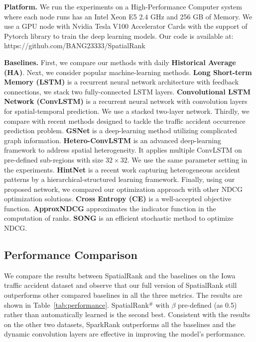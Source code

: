 \documentclass{article}
\begin{document}
{\textbf{Platform.} 
We run the experiments on a High-Performance Computer system where each node runs has an Intel Xeon E5 2.4 GHz and 256 GB of Memory. We use a GPU node with Nvidia Tesla V100 Accelerator Cards with the support of Pytorch library \cite{NEURIPS2019_9015} to train the deep learning models. Our code is available at: https://github.com/BANG23333/SpatialRank

\textbf{Baselines.} First, we compare our methods with daily \textbf{Historical Average (HA)}. Next, we consider popular machine-learning methods. \textbf{Long Short-term Memory (LSTM)} \cite{HochSchm97} is a recurrent neural network architecture with feedback connections, we stack two fully-connected LSTM layers. \textbf{Convolutional LSTM Network (ConvLSTM)} \cite{ShiXingjian2015CLNA} is a recurrent neural network with convolution layers for spatial-temporal prediction. We use a stacked two-layer network. Thirdly, we compare with recent methods designed to tackle the traffic accident occurrence prediction problem. \textbf{GSNet} \cite{Wang2021gsnet} is a deep-learning method utilizing complicated graph information. \textbf{Hetero-ConvLSTM} \cite{yuan2018hetero} is an advanced deep-learning framework to address spatial heterogeneity. It applies multiple ConvLSTM on pre-defined sub-regions with size $32\times32$. We use the same parameter setting in the experiments. \textbf{HintNet} \cite{doi:10.1137/1.9781611977172.38} is a recent work capturing heterogeneous accident patterns by a hierarchical-structured learning framework. Finally, using our proposed network, we compared our optimization approach with other NDCG optimization solutions. \textbf{Cross Entropy (CE)} is a well-accepted objective function. \textbf{ApproxNDCG} \cite{ApproxNDCG} approximates the indicator function in the computation of ranks. \textbf{SONG} \cite{Qiu2022LargescaleSO} is an efficient stochastic method to optimize NDCG.

\subsection{Performance Comparison}
We compare the results between SpatialRank and the baselines on the Iowa traffic accident dataset and observe that our full version of SpatialRank still outperforms other compared baselines in all the three metrics. The results are shown in Table~\ref{tab:performance}. SpatialRank$^\#$ with $\beta$ pre-defined (as 0.5) rather than automatically learned is the second best. Consistent with the results on the other two datasets, SparkRank outperforms all the baselines and the dynamic convolution layers are effective in improving the model's performance. 

}
\end{document}
